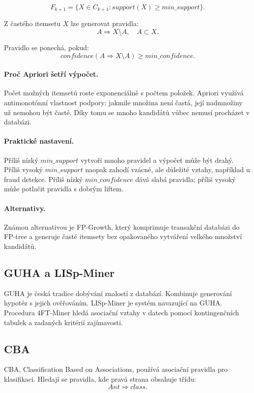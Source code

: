 \[
F_{k+1}=
\{X\in C_{k+1}: support(X)\geq min\_support\}.
\]

Z častého itemsetu $X$ lze generovat pravidla:
\[
A\Rightarrow X\setminus A,
\quad
A\subset X.
\]

Pravidlo se ponechá, pokud:
\[
confidence(A\Rightarrow X\setminus A)\geq min\_confidence.
\]

\paragraph{Proč Apriori šetří výpočet.}
Počet možných itemsetů roste exponenciálně s počtem položek. Apriori využívá antimonotónní vlastnost podpory:
jakmile množina není častá, její nadmnožiny už nemohou být časté. Díky tomu se mnoho kandidátů vůbec nemusí
procházet v databázi.

\paragraph{Praktické nastavení.}
Příliš nízký $min\_support$ vytvoří mnoho pravidel a výpočet může být drahý. Příliš vysoký $min\_support$
naopak zahodí vzácné, ale důležité vztahy, například u fraud detekce. Příliš nízký $min\_confidence$ dává
slabá pravidla; příliš vysoký může potlačit pravidla s dobrým liftem.

\paragraph{Alternativy.}
Známou alternativou je FP-Growth, který komprimuje transakční databázi do FP-tree a generuje časté itemsety
bez opakovaného vytváření velkého množství kandidátů.

\subsection{GUHA a LISp-Miner}

GUHA je česká tradice dobývání znalostí z databází. Kombinuje generování hypotéz s jejich ověřováním.
LISp-Miner je systém navazující na GUHA. Procedura 4FT-Miner hledá asociační vztahy v datech pomocí
kontingenčních tabulek a zadaných kritérií zajímavosti.

\subsection{CBA}

CBA, Classification Based on Associations, používá asociační pravidla pro klasifikaci. Hledají se pravidla,
kde pravá strana obsahuje třídu:
\[
Ant \Rightarrow class.
\]

